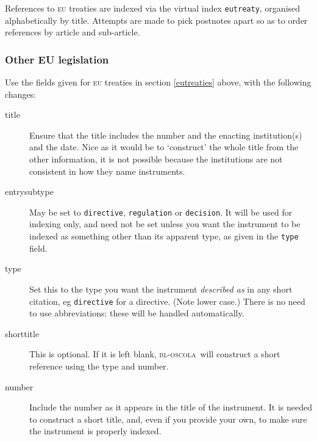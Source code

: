 \documentclass[a5paper,fontsize=9pt,DIV=1]{scrartcl}
\newcommand{\oscola}{\textsc{bl-oscola}}
\begin{document}
References to \textsc{eu} treaties are indexed via the virtual index
\texttt{eutreaty}, organised alphabetically by title. Attempts are
made to pick postnotes apart so as to order references by article and
sub-article.

\subsubsection{Other EU legislation}

Use the fields given for \textsc{eu} treaties in section
\ref{eutreaties} above, with the following changes:

\begin{description}
  \item[title] 
Ensure that the title includes the number and the
  enacting institution(s) and the date. Nice as it would be to
  `construct' the whole title from the other information, it is not
  possible because the institutions are not consistent in how they
  name instruments.
  \item[entrysubtype] 
  May be set to \texttt{directive},
  \texttt{regulation} or \texttt{decision}. It will be used for
  indexing only, and need not be set unless you want the instrument to
  be indexed as something other than its apparent type, as
  given in the \texttt{type} field.
  \item[type]
    Set this to the type you want the instrument
  \emph{described as}
  in any short citation, eg \texttt{directive} for a directive. 
  (Note lower case.) There is no need to use abbreviations: these 
  will be handled automatically.
  \item[shorttitle] 
  This is optional. If it is left blank,
  \oscola\ will construct a short reference using the type and number.
  \item[number] 
  Include the number as it appears in the title of
  the instrument. It is needed to construct a short title, and, even
  if you provide your own, to make sure the instrument is properly
  indexed.
\end{description}
\end{document}

